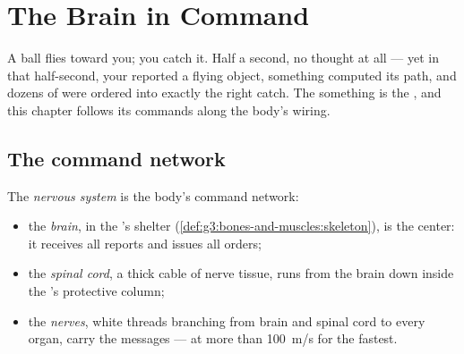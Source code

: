 \chapter{The Brain in Command}\label{ch:g5:brain-in-command}

A ball flies toward you; you catch it. Half a second, no
thought at all --- yet in that half-second, your  reported
a flying object, something computed its path, and dozens of
 were ordered into exactly the right catch. The
something is the , and this chapter follows its commands
along the body's wiring.

\section{The command network}

\begin{definition}\label{def:g5:brain-in-command:system}
The \emph{nervous system} is the body's
command network:
\begin{itemize}
  \item the \emph{brain}, in the 's shelter
        (\cref{def:g3:bones-and-muscles:skeleton}), is the
        center: it receives all reports and issues all orders;
  \item the \emph{spinal cord}, a thick
        cable of nerve tissue, runs from the brain down inside
        the 's protective column;
  \item the \emph{nerves}, white threads
        branching from brain and spinal cord to every organ,
        carry the messages --- at more than
        \qty{100}{m/s} for the fastest.
\end{itemize}
\end{definition}

